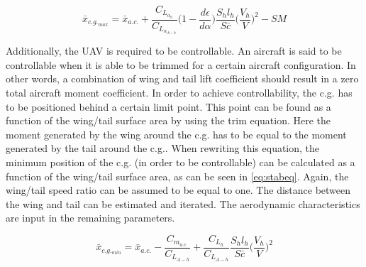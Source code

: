 \begin{equation}
\label{eq:stabSM}
    \bar{x}_{c.g._{max}}=\bar{x}_{a.c.}+\frac{C_{L_{\alpha_h}}}{C_{L_{\alpha_{A-h}}}}\Big(1-\frac{d\epsilon}{d\alpha}\Big)\frac{S_h l_h}{S\bar{c}}\Big(\frac{V_h}{V}\Big)^2-SM
\end{equation}


Additionally, the UAV is required to be controllable. An aircraft is said to be controllable when it is able to be trimmed for a certain aircraft configuration. In other words, a combination of wing and tail lift coefficient should result in a zero total aircraft moment coefficient. In order to achieve controllability, the c.g. has to be positioned behind a certain limit point. This point can be found as a function of the wing/tail surface area by using the trim equation. Here the moment generated by the wing around the c.g. has to be equal to the moment generated by the tail around the c.g.. When rewriting this equation, the minimum position of the c.g. (in order to be controllable) can be calculated as a function of the wing/tail surface area, as can be seen in \autoref{eq:stabeq}. Again, the wing/tail speed ratio can be assumed to be equal to one. The distance between the wing and tail can be estimated and iterated. The aerodynamic characteristics are input in the remaining parameters.

\begin{equation}
\label{eq:stabeq}
    \bar{x}_{c.g._{min}}=\bar{x}_{a.c.}-\frac{C_{m_{a.c.}}}{C_{L_{A-h}}}+\frac{C_{L_{h}}}{C_{L_{A-h}}}\frac{S_h l_h}{S \bar{c}}\Big(\frac{V_h}{V}\Big)^2
\end{equation}

